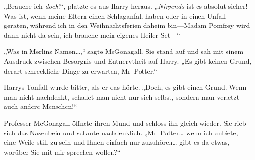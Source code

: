 „Brauche ich \emph{doch}!“, platzte es aus Harry heraus. \emph{„Nirgends} ist es absolut sicher! Was ist, wenn meine Eltern einen Schlaganfall haben oder in einen Unfall geraten, während ich in den Weihnachtsferien daheim bin—Madam Pomfrey wird dann nicht da sein, ich brauche mein eigenes Heiler-Set—“

„Was in Merlins Namen…,“ sagte McGonagall. Sie stand auf und sah mit einem Ausdruck zwischen Besorgnis und Entnervtheit auf Harry. „Es gibt keinen Grund, derart schreckliche Dinge zu erwarten, Mr~Potter.“

Harrys Tonfall wurde bitter, als er das hörte. „Doch, es gibt einen Grund. Wenn man nicht nachdenkt, schadet man nicht nur sich selbst, sondern man verletzt auch andere Menschen!“

Professor McGonagall öffnete ihren Mund und schloss ihn gleich wieder. Sie rieb sich das Nasenbein und schaute nachdenklich. „Mr~Potter… wenn ich anbiete, eine Weile still zu sein und Ihnen einfach nur zuzuhören… gibt es da etwas, worüber Sie mit mir sprechen wollen?“

